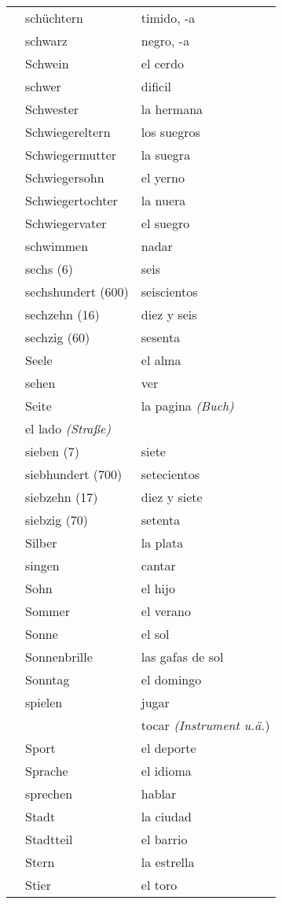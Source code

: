 \documentclass[10pt,spanish]{article}
\begin{document}
\begin{longtable}{p{} p{} | p{}}
& schüchtern & timido, -a\\
& schwarz & negro, -a  \\
& Schwein & el cerdo \\
& schwer & dificil  \\
& Schwester & la hermana  \\
& Schwiegereltern & los suegros  \\
& Schwiegermutter & la suegra  \\
& Schwiegersohn & el yerno  \\
& Schwiegertochter & la nuera  \\
& Schwiegervater & el suegro  \\
& schwimmen & nadar  \\
& sechs (6) & seis  \\
& sechshundert (600) & seiscientos   \\
& sechzehn (16) & diez y seis  \\
& sechzig (60) & sesenta  \\
& Seele & el alma  \\
& sehen & ver \\
& Seite & la pagina \textit{(Buch)} \\
& el lado \textit{(Straße)} \\
& sieben (7) & siete  \\
& siebhundert (700) & setecientos  \\
& siebzehn (17) & diez y siete  \\
& siebzig (70) & setenta  \\
& Silber & la plata  \\
& singen & cantar  \\
& Sohn & el hijo  \\
& Sommer & el verano  \\
& Sonne & el sol  \\
& Sonnenbrille & las gafas de sol \\
& Sonntag & el domingo  \\
& spielen & jugar  \\
& & tocar \textit{(Instrument u.ä.}) \\
& Sport & el deporte  \\
& Sprache & el idioma  \\
& sprechen & hablar  \\
& Stadt & la ciudad \\
& Stadtteil & el barrio  \\
& Stern & la estrella \\
& Stier & el toro  \\

\end{longtable}
\end{document}
